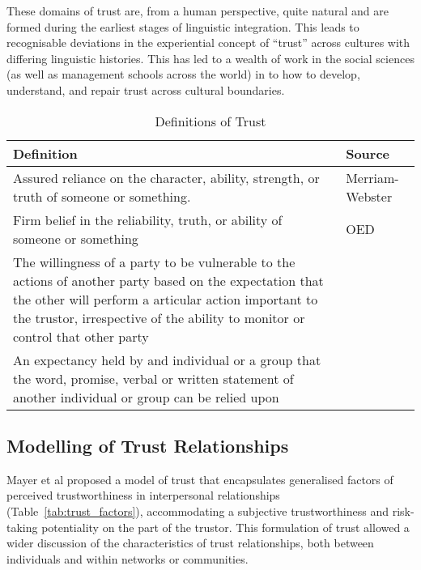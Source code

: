 These domains of trust are, from a human perspective, quite natural and are formed during the earliest stages of linguistic integration.
This leads to recognisable deviations in the experiential concept of ``trust'' across cultures with differing linguistic histories.
This has led to a wealth of work in the social sciences (as well as management schools across the world) in to how to develop, understand, and repair trust across cultural boundaries.\cite{Okumura2011} 
\begin{table}\centering
  \caption{Definitions of Trust}
  \label{tab:trust_definitions}
  \begin{tabularx}{\textwidth}{X p{3cm}}\toprule
    Definition & Source \\ \midrule
    Assured reliance on the character, ability, strength, or truth of someone or something.
    & Merriam-Webster\\
    Firm belief in the reliability, truth, or ability of someone or something & OED\\
    The willingness of a party to be vulnerable to the actions of another party based on the expectation that the other will perform a articular action important to the trustor, irrespective of the ability to monitor or control that other party & \cite{Mayer1995} \\
    An expectancy held by and individual or a group that the word, promise, verbal or written statement of another individual or group can be relied upon & \cite{Rotter1967}\\\bottomrule
  \end{tabularx}
\end{table}
\subsection{Modelling of Trust Relationships}
Mayer et al \cite{Mayer1995} proposed a model of trust that encapsulates generalised factors of perceived trustworthiness in interpersonal relationships (Table~\ref{tab:trust_factors}), accommodating a subjective trustworthiness and risk-taking potentiality on the part of the trustor.
This formulation of trust allowed a wider discussion of the characteristics of trust relationships, both between individuals and within networks or communities.

